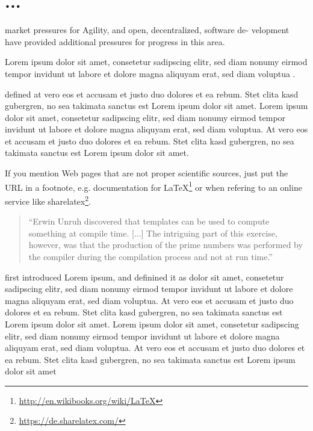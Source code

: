 \section*{...}


market pressures for Agility, and open, decentralized, software de- velopment have provided additional pressures for progress in this area.


Lorem ipsum dolor sit amet, consetetur sadipscing elitr, sed diam nonumy eirmod tempor invidunt ut labore et dolore magna aliquyam erat, sed diam voluptua \autocite[]{McConnell:2004:CCS:1096143}.

\textcite[1]{Vandevoorde:2002} defined at vero eos et accusam et justo duo dolores et ea rebum. Stet clita kasd gubergren, no sea takimata sanctus est Lorem ipsum dolor sit amet. Lorem ipsum dolor sit amet, consetetur sadipscing elitr, sed diam nonumy eirmod tempor invidunt ut labore et dolore magna aliquyam erat, sed diam voluptua. At vero eos et accusam et justo duo dolores et ea rebum. Stet clita kasd gubergren, no sea takimata sanctus est Lorem ipsum dolor sit amet.

If you mention Web pages that are not proper scientific sources, just put the URL in a footnote, e.g. documentation for \LaTeX\footnote{\url{http://en.wikibooks.org/wiki/LaTeX}}
or when refering to an online service like  sharelatex\footnote{\url{https://de.sharelatex.com/}}.


\begin{quote}
``Erwin Unruh discovered that templates can be used to compute
something at compile time. [...] The intriguing part of this exercise, however, was that the production of the prime numbers was performed by the compiler during the compilation process and not at run time.''
\autocite[305]{Vandevoorde:2002}
\end{quote}

\textcite[]{Vandevoorde:2002} first introduced Lorem ipsum, and definined it as dolor sit amet, consetetur sadipscing elitr, sed diam nonumy eirmod tempor invidunt ut labore et dolore magna aliquyam erat, sed diam voluptua. At vero eos et accusam et justo duo dolores et ea rebum. Stet clita kasd gubergren, no sea takimata sanctus est Lorem ipsum dolor sit amet. Lorem ipsum dolor sit amet, consetetur sadipscing elitr, sed diam nonumy eirmod tempor invidunt ut labore et dolore magna aliquyam erat, sed diam voluptua. At vero eos et accusam et justo duo dolores et ea rebum. Stet clita kasd gubergren, no sea takimata sanctus est Lorem ipsum dolor sit amet 

